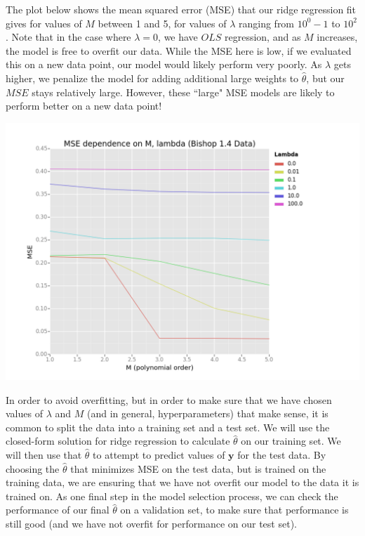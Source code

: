 \documentclass[10pt]{article}
\begin{document}
The plot below shows the mean squared error (MSE) that our ridge regression fit gives for values of $M$ between 1 and 5, for values of $\lambda$ ranging from $10^0 -1$ to $10^2$. Note that in the case where $\lambda = 0$, we have $OLS$ regression, and as $M$ increases, the model is free to overfit our data. While the MSE here is low, if we evaluated this on a new data point, our model would likely perform very poorly. As $\lambda$ gets higher, we penalize the model for adding additional large weights to $\hat{\theta}$, but our $MSE$ stays relatively large. However, these ``large" MSE models are likely to perform better on a new data point!

\begin{center}
\includegraphics[scale=.4]{MSE_Lambda_Bishop.png}
\end{center}

In order to avoid overfitting, but in order to make sure that we have chosen values of $\lambda$ and $M$ (and in general, hyperparameters) that make sense, it is common to split the data into a training set and a test set. We will use the closed-form solution for ridge regression to calculate $\hat{\theta}$ on our training set. We will then use that $\hat{\theta}$ to attempt to predict values of $\mathbf{y}$ for the test data. By choosing the $\hat{\theta}$ that minimizes MSE on the test data, but is trained on the training data, we are ensuring that we have not overfit our model to the data it is trained on. As one final step in the model selection process, we can check the performance of our final $\hat{\theta}$ on a validation set, to make sure that performance is still good (and we have not overfit for performance on our test set).
\end{document}
